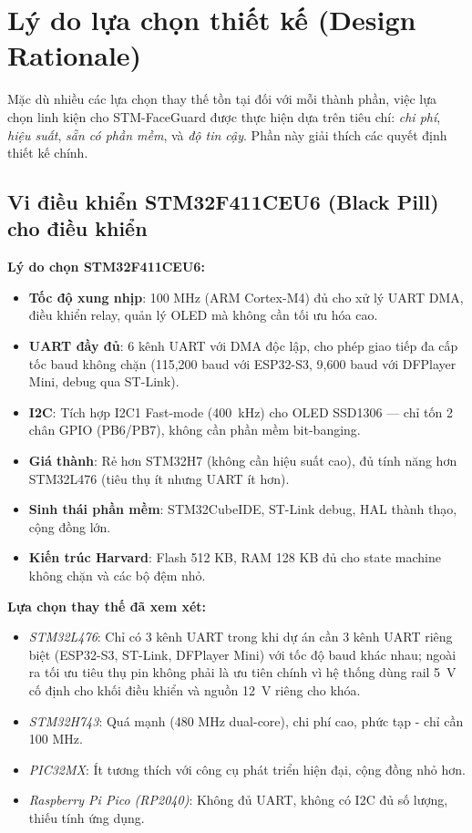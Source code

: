 \section{Lý do lựa chọn thiết kế (Design Rationale)}
\label{sec:design_rationale}

Mặc dù nhiều các lựa chọn thay thế tồn tại đối với mỗi thành phần, việc lựa chọn linh kiện cho STM-FaceGuard được thực hiện dựa trên tiêu chí: \textit{chi phí}, \textit{hiệu suất}, \textit{sẵn có phần mềm}, và \textit{độ tin cậy}. Phần này giải thích các quyết định thiết kế chính.

\subsection{Vi điều khiển STM32F411CEU6 (Black Pill) cho điều khiển}

\textbf{Lý do chọn STM32F411CEU6:}
\begin{itemize}
  \item \textbf{Tốc độ xung nhịp}: 100 MHz (ARM Cortex-M4) đủ cho xử lý UART DMA, điều khiển relay, quản lý OLED mà không cần tối ưu hóa cao.
  \item \textbf{UART đầy đủ}: 6 kênh UART với DMA độc lập, cho phép giao tiếp đa cấp tốc baud không chặn (115,200 baud với ESP32-S3, 9,600 baud với DFPlayer Mini, debug qua ST-Link).
  \item \textbf{I2C}: Tích hợp I2C1 Fast-mode (\SI{400}{kHz}) cho OLED SSD1306 --- chỉ tốn 2 chân GPIO (PB6/PB7), không cần phần mềm bit-banging.
  \item \textbf{Giá thành}: Rẻ hơn STM32H7 (không cần hiệu suất cao), đủ tính năng hơn STM32L476 (tiêu thụ ít nhưng UART ít hơn).
  \item \textbf{Sinh thái phần mềm}: STM32CubeIDE, ST-Link debug, HAL thành thạo, cộng đồng lớn.
  \item \textbf{Kiến trúc Harvard}: Flash 512 KB, RAM 128 KB đủ cho state machine không chặn và các bộ đệm nhỏ.
\end{itemize}

\textbf{Lựa chọn thay thế đã xem xét:}
\begin{itemize}
  \item \textit{STM32L476}: Chỉ có 3 kênh UART trong khi dự án cần 3 kênh UART riêng biệt (ESP32-S3, ST-Link, DFPlayer Mini) với tốc độ baud khác nhau; ngoài ra tối ưu tiêu thụ pin không phải là ưu tiên chính vì hệ thống dùng rail 5~V cố định cho khối điều khiển và nguồn 12~V riêng cho khóa.
  \item \textit{STM32H743}: Quá mạnh (480 MHz dual-core), chi phí cao, phức tạp - chỉ cần 100 MHz.
  \item \textit{PIC32MX}: Ít tương thích với công cụ phát triển hiện đại, cộng đồng nhỏ hơn.
  \item \textit{Raspberry Pi Pico (RP2040)}: Không đủ UART, không có I2C đủ số lượng, thiếu tính ứng dụng.
\end{itemize}

